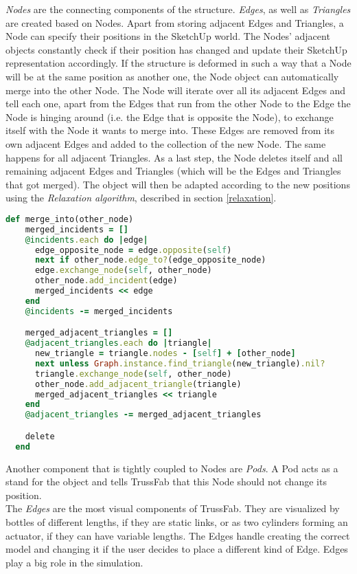 \textit{Nodes} are the connecting components of the structure. \textit{Edges}, as well as \textit{Triangles} are created based on Nodes. Apart from storing adjacent Edges and Triangles, a Node can specify their positions in the SketchUp world. The Nodes' adjacent objects constantly check if their position has changed and update their SketchUp representation accordingly. If the structure is deformed in such a way that a Node will be at the same position as another one, the Node object can automatically merge into the other Node. The Node will iterate over all its adjacent Edges and tell each one, apart from the Edges that run from the other Node to the Edge the Node is hinging around (i.e. the Edge that is opposite the Node), to exchange itself with the Node it wants to merge into. These Edges are removed from its own adjacent Edges and added to the collection of the new Node. The same happens for all adjacent Triangles. As a last step, the Node deletes itself and all remaining adjacent Edges and Triangles (which will be the Edges and Triangles that got merged). The object will then be adapted according to the new positions using the \textit{Relaxation algorithm}, described in section \ref{relaxation}.\\
\clearpage
\begin{lstlisting}[language=Ruby, caption=Merging of two Nodes]
  def merge_into(other_node)
    merged_incidents = []
    @incidents.each do |edge|
      edge_opposite_node = edge.opposite(self)
      next if other_node.edge_to?(edge_opposite_node)
      edge.exchange_node(self, other_node)
      other_node.add_incident(edge)
      merged_incidents << edge
    end
    @incidents -= merged_incidents

    merged_adjacent_triangles = []
    @adjacent_triangles.each do |triangle|
      new_triangle = triangle.nodes - [self] + [other_node]
      next unless Graph.instance.find_triangle(new_triangle).nil?
      triangle.exchange_node(self, other_node)
      other_node.add_adjacent_triangle(triangle)
      merged_adjacent_triangles << triangle
    end
    @adjacent_triangles -= merged_adjacent_triangles

    delete
  end
\end{lstlisting}\label{merging_code}
Another component that is tightly coupled to Nodes are \textit{Pods}. A Pod acts as a stand for the object and tells TrussFab that this Node should not change its position.\\
The \textit{Edges} are the most visual components of TrussFab. They are visualized by bottles of different lengths, if they are static links, or as two cylinders forming an actuator, if they can have variable lengths. The Edges handle creating the correct model and changing it if the user decides to place a different kind of Edge. Edges play a big role in the simulation.
